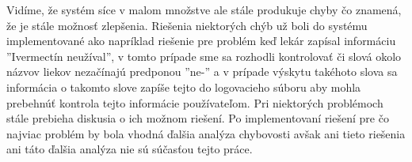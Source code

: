 Vidíme, že systém síce v malom množstve ale stále produkuje chyby čo znamená, že je stále možnosť zlepšenia. Riešenia niektorých chýb už boli do systému implementované ako napríklad riešenie pre problém keď lekár zapísal informáciu ''Ivermectín neužíval'', v tomto prípade sme sa rozhodli kontrolovať či slová okolo názvov liekov nezačínajú predponou ''ne-'' a v prípade výskytu takéhoto slova sa informácia o takomto slove zapíše tejto do logovacieho súboru aby mohla prebehnúť kontrola tejto informácie používateľom. Pri niektorých problémoch stále prebieha diskusia o ich možnom riešení. Po implementovaní riešení pre čo najviac problém by bola vhodná ďalšia analýza chybovosti avšak ani tieto riešenia ani táto ďalšia analýza nie sú súčasťou tejto práce.

